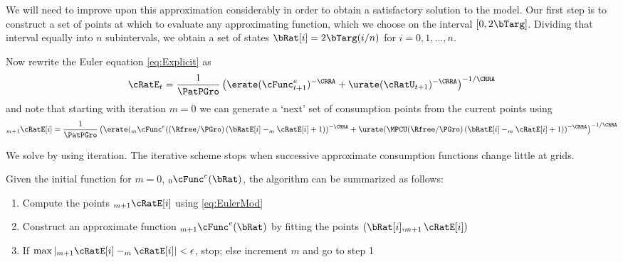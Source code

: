 \documentclass[titlepage]{\econtex}\newcommand{\texname}{cjSOE}
\begin{document}
We will need to improve upon this approximation considerably in order
to obtain a satisfactory solution to the model.  Our first step is to
construct a set of points at which to evaluate any approximating function, which
we choose on the interval $[0,2\bTarg]$. Dividing that interval equally into $n$ subintervals, we
obtain a set of states $\bRat[i]=2 \bTarg (i/n)$ for $i=0,1,...,n$.

Now rewrite the Euler equation \eqref{eq:Explicit} as
\begin{equation*}
    \cRatE_t= \frac{1}{\PatPGro }\left( \erate (\cFunc^{e}_{t+1})^{-\CRRA}+\urate (\cRatU_{t+1})^{-\CRRA} \right)^{-1/\CRRA}
\end{equation*}
and note that starting with iteration $m=0$ we can generate a `next' set of consumption points from the current points using
\begin{equation}
    _{m+1}\cRatE[i]= \frac{1}{\PatPGro }\left( \erate (_{m}\cFunc^{e}((\Rfree/\PGro)\left(\bRatE[i] -_{m}\cRatE[i]+1\right))^{-\CRRA}+\urate (\MPCU (\Rfree/\PGro)\left(\bRatE[i] -_{m}\cRatE[i]+1\right))^{-\CRRA} \right)^{-1/\CRRA}
\label{eq:EulerMod}
\end{equation}

We solve by using iteration. The iterative scheme stops when
successive approximate consumption functions change little at grids.

Given the initial function for $m=0$, $_{0}\cFunc^{e}(\bRat)$, the algorithm can be summarized as follows:
\begin{enumerate}
  \item Compute the points $_{m+1}\cRatE[i]$ using \eqref{eq:EulerMod}
  \item Construct an approximate function $_{m+1}\cFunc^{e}(\bRat)$ by fitting the points $(\bRat[i],_{m+1}\cRatE[i])$
  \item If $\max|_{m+1}\cRatE[i]-_{m}\cRatE[i]|<\epsilon$, stop; else increment $m$ and go to step 1
\end{enumerate}
\newpage


\end{document}
